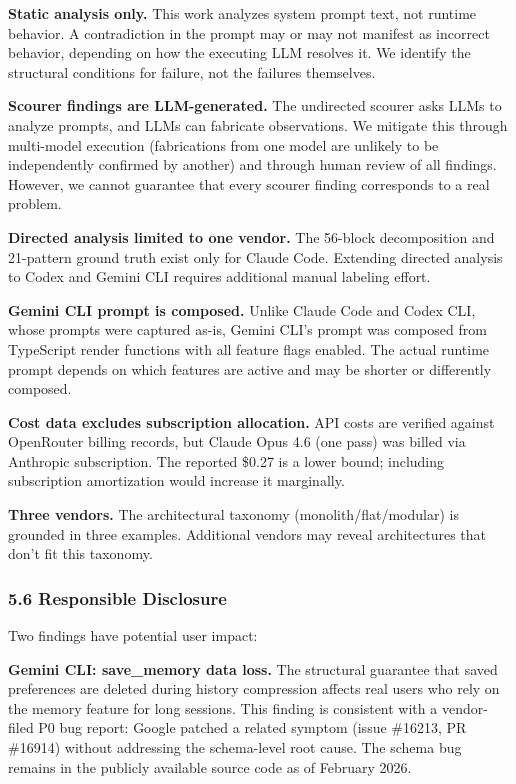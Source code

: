 \documentclass[
]{article}
\begin{document}
\textbf{Static analysis only.} This work analyzes system prompt text,
not runtime behavior. A contradiction in the prompt may or may not
manifest as incorrect behavior, depending on how the executing LLM
resolves it. We identify the structural conditions for failure, not the
failures themselves.

\textbf{Scourer findings are LLM-generated.} The undirected scourer asks
LLMs to analyze prompts, and LLMs can fabricate observations. We
mitigate this through multi-model execution (fabrications from one model
are unlikely to be independently confirmed by another) and through human
review of all findings. However, we cannot guarantee that every scourer
finding corresponds to a real problem.

\textbf{Directed analysis limited to one vendor.} The 56-block
decomposition and 21-pattern ground truth exist only for Claude Code.
Extending directed analysis to Codex and Gemini CLI requires additional
manual labeling effort.

\textbf{Gemini CLI prompt is composed.} Unlike Claude Code and Codex
CLI, whose prompts were captured as-is, Gemini CLI's prompt was composed
from TypeScript render functions with all feature flags enabled. The
actual runtime prompt depends on which features are active and may be
shorter or differently composed.

\textbf{Cost data excludes subscription allocation.} API costs are
verified against OpenRouter billing records, but Claude Opus 4.6 (one
pass) was billed via Anthropic subscription. The reported \$0.27 is a
lower bound; including subscription amortization would increase it
marginally.

\textbf{Three vendors.} The architectural taxonomy
(monolith/flat/modular) is grounded in three examples. Additional
vendors may reveal architectures that don't fit this taxonomy.

\hypertarget{responsible-disclosure}{%
\subsubsection{5.6 Responsible
Disclosure}\label{responsible-disclosure}}

Two findings have potential user impact:

\textbf{Gemini CLI: save\_memory data loss.} The structural guarantee
that saved preferences are deleted during history compression affects
real users who rely on the memory feature for long sessions. This
finding is consistent with a vendor-filed P0 bug report: Google patched
a related symptom (issue \#16213, PR \#16914) without addressing the
schema-level root cause. The schema bug remains in the publicly
available source code as of February 2026.
\end{document}
